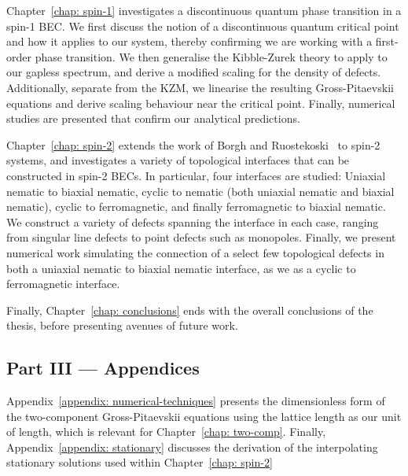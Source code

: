 Chapter~\ref{chap: spin-1} investigates a discontinuous quantum phase
transition in a spin-1 BEC\@.
We first discuss the notion of a discontinuous quantum critical point and how it
applies to our system, thereby confirming we are working with a first-order
phase transition.
We then generalise the Kibble-Zurek theory to apply to our gapless spectrum,
and derive a modified scaling for the density of defects.
Additionally, separate from the KZM, we linearise the resulting Gross-Pitaevskii
equations and derive scaling behaviour near the critical point.
Finally, numerical studies are presented that confirm our analytical
predictions.

Chapter~\ref{chap: spin-2} extends the work of Borgh and
Ruostekoski~\cite{Borgh2012, Borgh2013, Borgh2014} to spin-2 systems, and
investigates a variety of topological interfaces that can be constructed in
spin-2 BECs.
In particular, four interfaces are studied: Uniaxial nematic to biaxial nematic,
cyclic to nematic (both uniaxial nematic and biaxial nematic), cyclic to
ferromagnetic, and finally ferromagnetic to biaxial nematic.
We construct a variety of defects spanning the interface in each case, ranging
from singular line defects to point defects such as monopoles.
Finally, we present numerical work simulating the connection of a select few
topological defects in both a uniaxial nematic to biaxial nematic interface, as
we as a cyclic to ferromagnetic interface.

Finally, Chapter~\ref{chap: conclusions} ends with the overall conclusions of
the thesis, before presenting avenues of future work.

\subsection*{Part III --- Appendices}
Appendix~\ref{appendix: numerical-techniques} presents the dimensionless form of
the two-component Gross-Pitaevskii equations using the lattice length as our
unit of length, which is relevant for Chapter~\ref{chap: two-comp}.
Finally, Appendix~\ref{appendix: stationary} discusses the derivation of the
interpolating stationary solutions used within Chapter~\ref{chap: spin-2}
